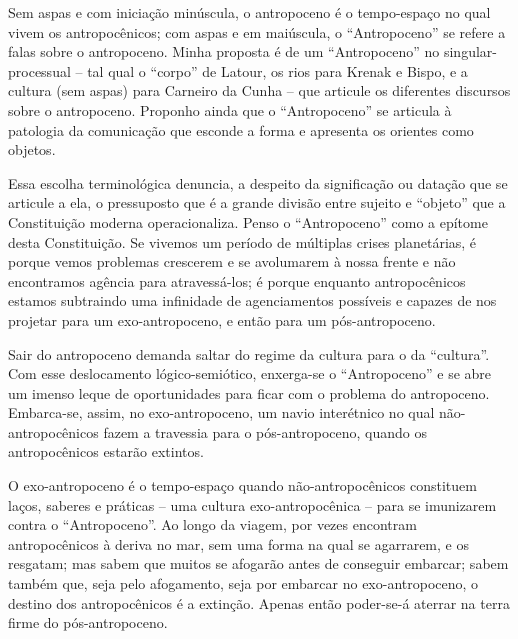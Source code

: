Sem aspas e com iniciação minúscula, o antropoceno é o tempo-espaço no qual vivem os antropocênicos; com aspas e em maiúscula, o \enquote{Antropoceno} se refere a \guillemetleft falas sobre o antropoceno\guillemetright. Minha proposta é de um \enquote{Antropoceno} no singular-processual -- tal qual o \enquote{corpo} de Latour, os rios para Krenak e Bispo, e a cultura (sem aspas) para Carneiro da Cunha -- que articule os diferentes discursos sobre o antropoceno. Proponho ainda que o \enquote{Antropoceno} se articula à patologia da comunicação que esconde a forma e apresenta os orientes como objetos.

Essa escolha terminológica denuncia, a despeito da significação ou datação que se articule a ela, o pressuposto que é a grande divisão entre sujeito e \enquote{objeto} que a Constituição moderna operacionaliza. Penso o \enquote{Antropoceno} como a epítome desta Constituição. Se vivemos um período de múltiplas crises planetárias, é porque vemos problemas crescerem e se avolumarem à nossa frente e não encontramos agência para atravessá-los; é porque enquanto antropocênicos estamos subtraindo uma infinidade de agenciamentos possíveis e capazes de nos projetar para um exo-antropoceno, e então para um pós-antropoceno.

Sair do antropoceno demanda saltar do regime da cultura para o da \enquote{cultura}. Com esse deslocamento lógico-semiótico, enxerga-se o \enquote{Antropoceno} e se abre um imenso leque de oportunidades para ficar com o problema do antropoceno. Embarca-se, assim, no exo-antropoceno, um navio interétnico no qual não-antropocênicos fazem a travessia para o pós-antropoceno, quando os antropocênicos estarão extintos.

O exo-antropoceno é o tempo-espaço quando não-antropocênicos constituem laços, saberes e práticas -- uma cultura exo-antropocênica -- para se imunizarem contra o \enquote{Antropoceno}. Ao longo da viagem, por vezes encontram antropocênicos à deriva no mar, sem uma forma na qual se agarrarem, e os resgatam; mas sabem que muitos se afogarão antes de conseguir embarcar; sabem também que, seja pelo afogamento, seja por embarcar no exo-antropoceno, o destino dos antropocênicos é a extinção. Apenas então poder-se-á aterrar na terra firme do pós-antropoceno.


